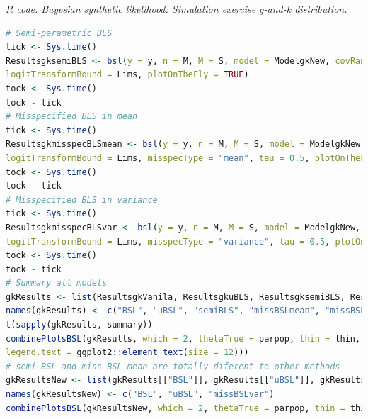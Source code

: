 \begin{enumerate}[leftmargin=*]
\begin{tcolorbox}[enhanced,width=4.67in,center upper,
	fontupper=\large\bfseries,drop shadow southwest,sharp corners]
	\textit{R code. Bayesian synthetic likelihood: Simulation exercise g-and-k distribution.}
	\begin{VF}
		\begin{lstlisting}[language=R]
# Semi-parametric BLS
tick <- Sys.time()
ResultsgksemiBLS <- bsl(y = y, n = M, M = S, model = ModelgkNew, covRandWalk = tune*CovarRW, method = "semiBSL", thetaNames = expression(theta, a, b, g, k),
logitTransformBound = Lims, plotOnTheFly = TRUE)
tock <- Sys.time()
tock - tick
# Misspecified BLS in mean
tick <- Sys.time()
ResultsgkmisspecBLSmean <- bsl(y = y, n = M, M = S, model = ModelgkNew, covRandWalk = tune*CovarRW, method = "BSLmisspec", thetaNames = expression(theta, a, b, g, k),
logitTransformBound = Lims, misspecType = "mean", tau = 0.5, plotOnTheFly = TRUE)
tock <- Sys.time()
tock - tick
# Misspecified BLS in variance
tick <- Sys.time()
ResultsgkmisspecBLSvar <- bsl(y = y, n = M, M = S, model = ModelgkNew, covRandWalk = tune*CovarRW, method = "BSLmisspec", thetaNames = expression(theta, a, b, g, k), 
logitTransformBound = Lims, misspecType = "variance", tau = 0.5, plotOnTheFly = TRUE)
tock <- Sys.time()
tock - tick
# Summary all models
gkResults <- list(ResultsgkVanila, ResultsgkuBLS, ResultsgksemiBLS, ResultsgkmisspecBLSmean, ResultsgkmisspecBLSvar)
names(gkResults) <- c("BSL", "uBSL", "semiBLS", "missBSLmean", "missBSLvar")
t(sapply(gkResults, summary))
combinePlotsBSL(gkResults, which = 2, thetaTrue = parpop, thin = thin, options.linetype = list(values = 1:8), options.size = list(values = rep(1, 8)), options.theme = list(plot.margin = grid::unit(rep(0.03, 4), "npc"), axis.title = ggplot2::element_text(size = 12), axis.text = ggplot2::element_text(size = 8),
legend.text = ggplot2::element_text(size = 12)))
# semi BSL and miss BSL mean are totally diferent to other methods 
gkResultsNew <- list(gkResults[["BSL"]], gkResults[["uBSL"]], gkResults[["missBSLvar"]])
names(gkResultsNew) <- c("BSL", "uBSL", "missBSLvar")
combinePlotsBSL(gkResultsNew, which = 2, thetaTrue = parpop, thin = thin, options.linetype = list(values = 1:8), options.size = list(values = rep(1, 8)), options.theme = list(plot.margin = grid::unit(rep(0.03, 4), "npc"), legend.text = ggplot2::element_text(size = 12)))
\end{lstlisting}
	\end{VF}
\end{tcolorbox}

\end{enumerate}